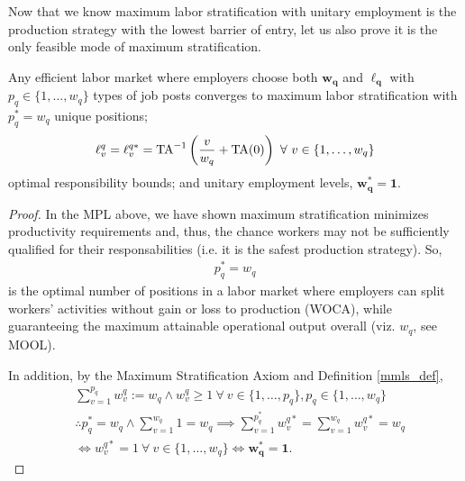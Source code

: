\documentclass[hidelinks, nonatbib]{elsarticle}
\begin{document}
Now that we know maximum labor stratification with unitary employment is the production strategy with the lowest barrier of entry, let us also prove it is the only feasible mode of maximum stratification.

\begin{lemma}
    Any efficient labor market where employers choose both $\boldsymbol{w_q}$ and $\boldsymbol{\ell_q}$ with $p_q \in \{1, \dots, w_q\}$ types of job posts converges to maximum labor stratification with
    $
    p_{q}^{*} = w_q
    $
    unique positions;
    \begin{gather}
    \ell_{v}^{q}
    =
    \ell_{v}^{q*}
    =
    \text{TA}^{-1}\left(
        \frac{v}{w_q}
        +
        \text{TA}(0)
    \right)
    \
    \forall
    \
    v \in 
    \left\{
        1, \dots, w_q
    \right\}
    \end{gather}
    optimal responsibility bounds; and unitary employment levels,
    $
    \boldsymbol{w_{q}^{*}} =
    \boldsymbol{1}
    .
    $
    
    \begin{proof}
        In the MPL above, we have shown maximum stratification minimizes productivity requirements and, thus, the chance workers may not be sufficiently qualified for their responsabilities (i.e. it is the safest production strategy). So, 
        \begin{gather}
            p_{q}^{*} = w_q
        \end{gather}
        is the optimal number of positions in a labor market where employers can split workers' activities without gain or loss to production (WOCA), while guaranteeing the maximum attainable operational output overall (viz. $w_q$, see MOOL).
        
        In addition, by the Maximum Stratification Axiom and Definition \ref{mmls_def},
        \begin{align}
            &
            \sum_{v=1}^{p_q}{
                w_{v}^{q}
            }
            := 
            w_q
            \land
            w_{v}^{q} 
            \geq 
            1
            \
            \forall
            \
            v \in \{1, \dots, p_q\},
            p_q \in \{1, \dots, w_q\}
            \\
            &
            \therefore
            p_{q}^{*} = w_q
            \land
            \sum_{v=1}^{w_q}
            1
            =
            w_q
            \implies
            \sum_{v=1}^{p_{q}^{*}}{
                w_{v}^{q*}
            }
            =
            \sum_{v=1}^{w_q}{
                w_{v}^{q*}
            }
            =
            w_q
            \\
            &
            \iff
            w_{v}^{q*}
            =
            1
            \
            \forall
            \
            v \in \{1, \dots, w_q\}
            \iff
            \boldsymbol{w_{q}^{*}} =
            \boldsymbol{1}
            .
            \end{align}
            

\end{proof}
\end{lemma}
\end{document}
